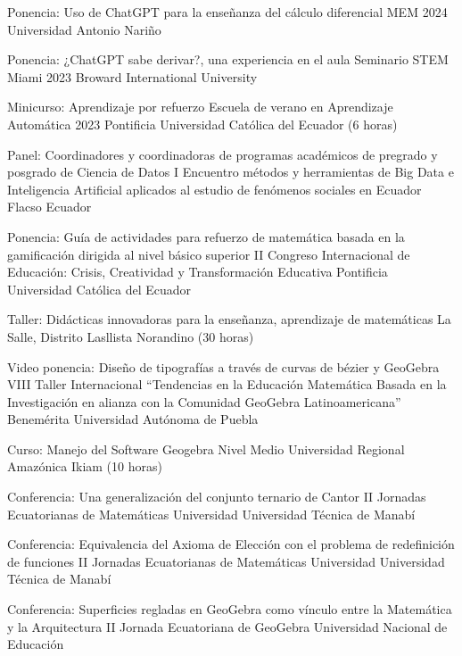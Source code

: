 \documentclass[
	a4paper,
	maincolor=cvblue!70!blue,
	sidecolor=gray!30,
	sectioncolor=cvblue!70!blue,
    sidebarwidth=7.5cm,
	topbottommargin=20pt,
	leftrightmargin=20pt,
]{fortysecondscv}
\begin{document}
    {Ponencia: Uso de ChatGPT para la enseñanza del cálculo diferencial}
    {MEM 2024}
    {Universidad Antonio Nariño}
    
    {Ponencia: ¿ChatGPT sabe derivar?, una experiencia en el aula}
    {Seminario STEM Miami 2023}
    {Broward International University}
    
    
    {Minicurso: Aprendizaje por refuerzo}
    {Escuela de verano en Aprendizaje Automática 2023}
    {Pontificia Universidad Católica del Ecuador (6 horas)}
    
    
    {Panel: Coordinadores y coordinadoras de  programas académicos de pregrado y posgrado de Ciencia de Datos}
    {I Encuentro métodos y herramientas de Big Data e Inteligencia Artificial aplicados al estudio de fenómenos sociales en Ecuador}
    {Flacso Ecuador}
    
    {Ponencia: Guía de actividades para refuerzo de matemática basada en la gamificación dirigida al nivel básico superior}
    {II Congreso Internacional de Educación: Crisis, Creatividad y Transformación Educativa}
    {Pontificia Universidad Católica del Ecuador}
    
    {Taller: Didácticas innovadoras para la enseñanza, aprendizaje de matemáticas}
    {}
    {La Salle, Distrito Lasllista Norandino (30 horas)}
    
    {Video ponencia: Diseño de tipografías a través de curvas de bézier y GeoGebra}
    {VIII Taller Internacional “Tendencias en la Educación Matemática Basada en la Investigación en alianza con la Comunidad GeoGebra Latinoamericana”}
    {Benemérita Universidad Autónoma de Puebla}
    

    {Curso: Manejo del Software Geogebra Nivel Medio}
    {}
    {Universidad Regional Amazónica Ikiam (10 horas)}
    
    {Conferencia: Una generalización del conjunto ternario de Cantor}
    {II Jornadas Ecuatorianas de Matemáticas}
    {Universidad Universidad Técnica de Manabí}
    

    {Conferencia: Equivalencia del Axioma de Elección con el problema de redefinición de funciones}
    {II Jornadas Ecuatorianas de Matemáticas}
    {Universidad Universidad Técnica de Manabí}
    
    {Conferencia: Superficies regladas en GeoGebra como vínculo entre la Matemática y la Arquitectura}
    {II Jornada Ecuatoriana de GeoGebra}
    {Universidad Nacional de Educación}
    
\end{document}
